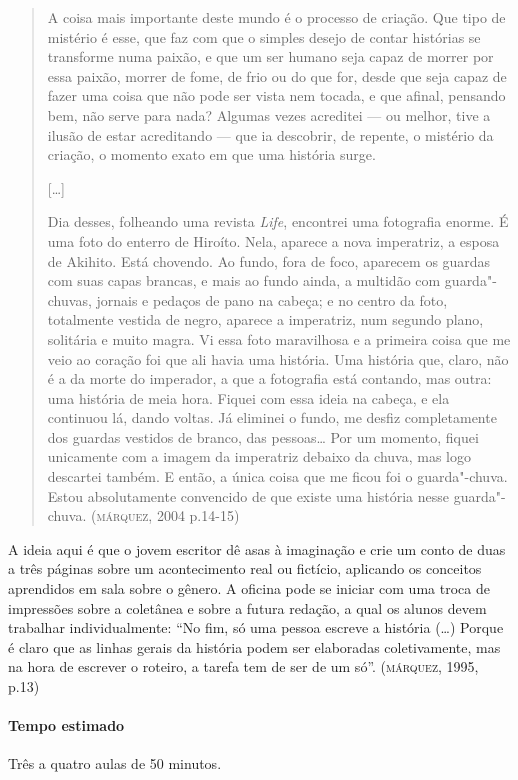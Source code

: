 \documentclass[11pt]{extarticle}
\begin{document}
\begin{quote}
A coisa mais importante deste mundo é o processo de criação. Que tipo de
mistério é esse, que faz com que o simples desejo de contar histórias se
transforme numa paixão, e que um ser humano seja capaz de morrer por
essa paixão, morrer de fome, de frio ou do que for, desde que seja capaz
de fazer uma coisa que não pode ser vista nem tocada, e que afinal,
pensando bem, não serve para nada? Algumas vezes acreditei --- ou
melhor, tive a ilusão de estar acreditando --- que ia descobrir, de
repente, o mistério da criação, o momento exato em que uma história
surge.

{[}\ldots{}{]}

Dia desses, folheando uma revista \emph{Life}, encontrei uma fotografia
enorme. É uma foto do enterro de Hiroíto. Nela, aparece a nova
imperatriz, a esposa de Akihito. Está chovendo. Ao fundo, fora de foco,
aparecem os guardas com suas capas brancas, e mais ao fundo ainda, a
multidão com guarda"-chuvas, jornais e pedaços de pano na cabeça; e no
centro da foto, totalmente vestida de negro, aparece a imperatriz, num
segundo plano, solitária e muito magra. Vi essa foto maravilhosa e a
primeira coisa que me veio ao coração foi que ali havia uma história.
Uma história que, claro, não é a da morte do imperador, a que a
fotografia está contando, mas outra: uma história de meia hora. Fiquei
com essa ideia na cabeça, e ela continuou lá, dando voltas. Já eliminei
o fundo, me desfiz completamente dos guardas vestidos de branco, das
pessoas\ldots{} Por um momento, fiquei unicamente com a imagem da imperatriz
debaixo da chuva, mas logo descartei também. E então, a única coisa que
me ficou foi o guarda"-chuva. Estou absolutamente convencido de que
existe uma história nesse guarda"-chuva. (\textsc{márquez}, 2004 p.14-15)
\end{quote}

A ideia aqui é que o jovem escritor dê asas à imaginação e crie um conto
de duas a três páginas sobre um acontecimento real ou fictício,
aplicando os conceitos aprendidos em sala sobre o gênero. A oficina pode
se iniciar com uma troca de impressões sobre a coletânea e sobre a
futura redação, a qual os alunos devem trabalhar individualmente: ``No
fim, só uma pessoa escreve a história (\ldots{}) Porque é claro que as linhas
gerais da história podem ser elaboradas coletivamente, mas na hora de
escrever o roteiro, a tarefa tem de ser de um só''. (\textsc{márquez}, 1995,
p.13)

\paragraph{Tempo estimado} Três a quatro aulas de 50 minutos.
\end{document}
